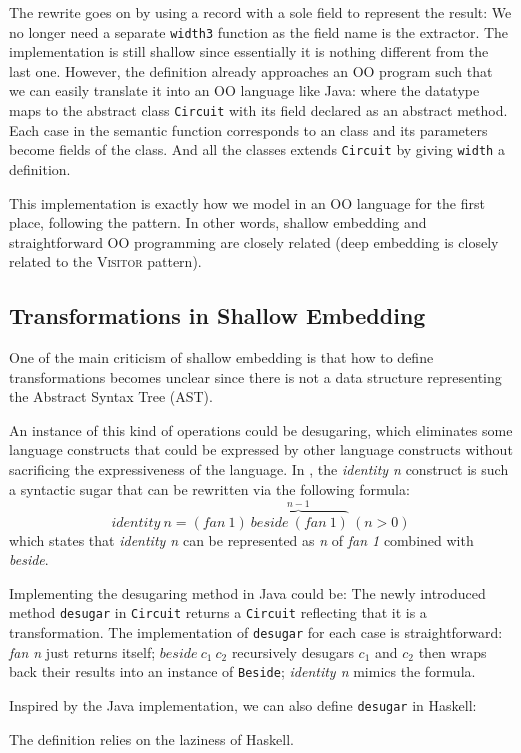 The rewrite goes on by using a record with a sole field to represent the result:
We no longer need a separate \texttt{width3} function as the field name is the extractor.
The implementation is still shallow since essentially it is nothing different
from the last one.
However, the definition already approaches an OO program such that we can easily
translate it into an OO language like Java:
where the datatype maps to the abstract class \texttt{Circuit} with its field declared as an abstract method.
Each case in the semantic function corresponds to an class and its parameters become fields of the class.
And all the classes extends \texttt{Circuit} by giving \texttt{width} a definition.

This implementation is exactly how we model \dsl in an OO language for the first
place, following the \interp pattern.
In other words, shallow embedding and straightforward OO programming are closely
related (deep embedding is closely related to the \textsc{Visitor} pattern).

\subsection{Transformations in Shallow Embedding}
One of the main criticism of shallow embedding is that how to define transformations
becomes unclear since there is not a data structure representing the Abstract Syntax Tree (AST).

An instance of this kind of operations could be desugaring, which eliminates some
language constructs that could be expressed by other language constructs without
sacrificing the expressiveness of the language.
In \dsl, the \emph{identity n} construct is such a syntactic sugar that can
be rewritten via the following formula:
$$identity\ n = (fan\ 1) \overbrace{\ beside\ (fan\ 1)}^{n-1}\ (n > 0)$$
which states that \emph{identity n} can be represented as \emph{n} of \emph{fan 1} combined with \emph{beside}.

Implementing the desugaring method in Java could be:
The newly introduced method \texttt{desugar} in \texttt{Circuit} returns a \texttt{Circuit} reflecting that it is a transformation. The implementation of \texttt{desugar} for each case is
straightforward: \emph{fan n} just returns itself; $beside\ c_1\ c_2$ recursively desugars $c_1$ and $c_2$ then wraps back
their results into an instance of \texttt{Beside}; \emph{identity n} mimics the
formula.

Inspired by the Java implementation, we can also define \texttt{desugar} in Haskell:

The definition relies on the laziness of Haskell.
